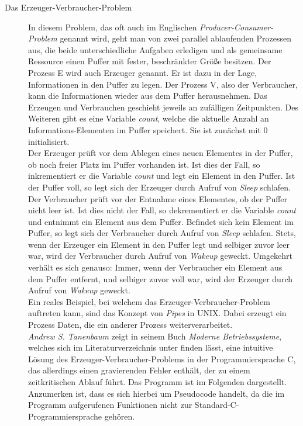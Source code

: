 \begin{description}
						\begin{description}
							\item[Das Erzeuger-Verbraucher-Problem]
							
								In diesem Problem, das oft auch im Englischen \textit{Producer-Consumer-Problem} genannt wird, geht man von zwei parallel ablaufenden Prozessen aus, die beide unterschiedliche Aufgaben erledigen und als gemeinsame Ressource einen Puffer mit fester, beschränkter Größe besitzen. Der Prozess E wird auch Erzeuger genannt. Er ist dazu in der Lage, Informationen in den Puffer zu legen. Der Prozess V, also der Verbraucher, kann die Informationen wieder aus dem Puffer herausnehmen. Das Erzeugen und Verbrauchen geschieht jeweils an zufälligen Zeitpunkten. Des Weiteren gibt es eine Variable \textit{count}, welche die aktuelle Anzahl an Informations-Elementen im Puffer speichert. Sie ist zunächst mit 0 initialisiert.\\
								Der Erzeuger prüft vor dem Ablegen eines neuen Elementes in der Puffer, ob noch freier Platz im Puffer vorhanden ist. Ist dies der Fall, so inkrementiert er die Variable \textit{count} und legt ein Element in den Puffer. Ist der Puffer voll, so legt sich der Erzeuger durch Aufruf von \textit{Sleep} schlafen. Der Verbraucher prüft vor der Entnahme eines Elementes, ob der Puffer nicht leer ist. Ist dies nicht der Fall, so dekrementiert er die Variable \textit{count} und entnimmt ein Element aus dem Puffer. Befindet sich kein Element im Puffer, so legt sich der Verbraucher durch Aufruf von \textit{Sleep} schlafen. Stets, wenn der Erzeuger ein Element in den Puffer legt und selbiger zuvor leer war, wird der Verbraucher durch Aufruf von \textit{Wakeup} geweckt. Umgekehrt verhält es sich genauso: Immer, wenn der Verbraucher ein Element aus dem Puffer entfernt, und selbiger zuvor voll war, wird der Erzeuger durch Aufruf von \textit{Wakeup} geweckt.\\
								Ein reales Beispiel, bei welchem das Erzeuger-Verbraucher-Problem auftreten kann, sind das Konzept von \textit{Pipes} in UNIX. Dabei erzeugt ein Prozess Daten, die ein anderer Prozess weiterverarbeitet.\\
								\textit{Andrew S. Tanenbaum} zeigt in seinem Buch \textit{Moderne Betriebssysteme}, welches sich im Literaturverzeichnis unter \cite{ModerneBetriebssysteme} finden lässt, eine intuitive Lösung des Erzeuger-Verbraucher-Problems in der Programmiersprache C, das allerdings einen gravierenden Fehler enthält, der zu einem zeitkritischen Ablauf führt. Das Programm ist im Folgenden dargestellt. Anzumerken ist, dass es sich hierbei um Pseudocode handelt, da die im Programm aufgerufenen Funktionen nicht zur Standard-C-Programmiersprache gehören.
								

\end{description}
\end{description}
